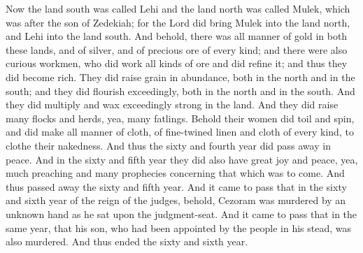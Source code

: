 Now the land south was called Lehi and the land north was called Mulek, which was after the son of Zedekiah; for the Lord did bring Mulek into the land north, and Lehi into the land south.
\bverse \iffalse And behold, there was all manner of gold in both these lands, and of silver, and of precious ore of every kind; and there were also curious workmen, who did work all kinds of ore and did refine it; and thus they did become rich. \fi
And behold, there was all manner of gold in both these lands, and of silver, and of precious ore of every kind; and there were also curious workmen, who did work all kinds of ore and did refine it; and thus they did become rich.
\bverse \iffalse They did raise grain in abundance, both in the north and in the south; and they did flourish exceedingly, both in the north and in the south. And they did multiply and wax exceedingly strong in the land. And they did raise many flocks and herds, yea, many fatlings. \fi
They did raise grain in abundance, both in the north and in the south; and they did flourish exceedingly, both in the north and in the south. And they did multiply and wax exceedingly strong in the land. And they did raise many flocks and herds, yea, many fatlings.
\bverse \iffalse Behold their women did toil and spin, and did make all manner of cloth, of fine-twined linen and cloth of every kind, to clothe their nakedness. And thus the sixty and fourth year did pass away in peace. \fi
Behold their women did toil and spin, and did make all manner of cloth, of fine-twined linen and cloth of every kind, to clothe their nakedness. And thus the sixty and fourth year did pass away in peace.
\bverse \iffalse And in the sixty and fifth year they did also have great joy and peace, yea, much preaching and many prophecies concerning that which was to come. And thus passed away the sixty and fifth year. \fi
And in the sixty and fifth year they did also have great joy and peace, yea, much preaching and many prophecies concerning that which was to come. And thus passed away the sixty and fifth year.
\bverse \iffalse And it came to pass that in the sixty and sixth year of the reign of the judges, behold, Cezoram was murdered by an unknown hand as he sat upon the judgment-seat. And it came to pass that in the same year, that his son, who had been appointed by the people in his stead, was also murdered. And thus ended the sixty and sixth year. \fi
And it came to pass that in the sixty and sixth year of the reign of the judges, behold, Cezoram was murdered by an unknown hand as he sat upon the judgment-seat. And it came to pass that in the same year, that his son, who had been appointed by the people in his stead, was also murdered. And thus ended the sixty and sixth year.
